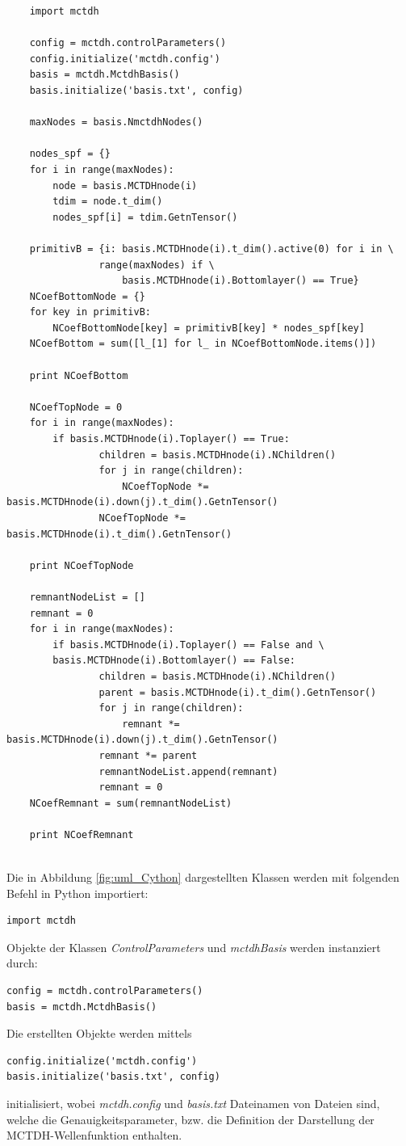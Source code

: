 \begin{verbatim}
    import mctdh

    config = mctdh.controlParameters()
    config.initialize('mctdh.config')
    basis = mctdh.MctdhBasis()
    basis.initialize('basis.txt', config)
    
    maxNodes = basis.NmctdhNodes()
    
    nodes_spf = {}
    for i in range(maxNodes):
        node = basis.MCTDHnode(i)
        tdim = node.t_dim()
        nodes_spf[i] = tdim.GetnTensor() 
    
    primitivB = {i: basis.MCTDHnode(i).t_dim().active(0) for i in \
                range(maxNodes) if \
                    basis.MCTDHnode(i).Bottomlayer() == True}
    NCoefBottomNode = {}
    for key in primitivB:
        NCoefBottomNode[key] = primitivB[key] * nodes_spf[key]
    NCoefBottom = sum([l_[1] for l_ in NCoefBottomNode.items()])
    
    print NCoefBottom

    NCoefTopNode = 0
    for i in range(maxNodes):
        if basis.MCTDHnode(i).Toplayer() == True:
                children = basis.MCTDHnode(i).NChildren()
                for j in range(children):
                    NCoefTopNode *= basis.MCTDHnode(i).down(j).t_dim().GetnTensor()
                NCoefTopNode *= basis.MCTDHnode(i).t_dim().GetnTensor()
    
    print NCoefTopNode
    
    remnantNodeList = []
    remnant = 0
    for i in range(maxNodes):
        if basis.MCTDHnode(i).Toplayer() == False and \
        basis.MCTDHnode(i).Bottomlayer() == False:
                children = basis.MCTDHnode(i).NChildren()
                parent = basis.MCTDHnode(i).t_dim().GetnTensor()
                for j in range(children):
                    remnant *= basis.MCTDHnode(i).down(j).t_dim().GetnTensor() 
                remnant *= parent
                remnantNodeList.append(remnant)
                remnant = 0
    NCoefRemnant = sum(remnantNodeList)
    
    print NCoefRemnant
    
\end{verbatim}

Die in Abbildung \ref{fig:uml_Cython} dargestellten Klassen werden mit folgenden Befehl in Python importiert:

\begin{verbatim}
import mctdh
\end{verbatim}
Objekte der Klassen \textit{ControlParameters} und \textit{mctdhBasis} werden instanziert durch:
\begin{verbatim}
config = mctdh.controlParameters()
basis = mctdh.MctdhBasis()
\end{verbatim}
Die erstellten Objekte werden mittels
\begin{verbatim}
config.initialize('mctdh.config')
basis.initialize('basis.txt', config)
\end{verbatim}
initialisiert, wobei \textit{mctdh.config} und \textit{basis.txt} Dateinamen von Dateien sind, 
welche die Genauigkeitsparameter, bzw. die Definition der Darstellung der MCTDH-Wellenfunktion enthalten.

